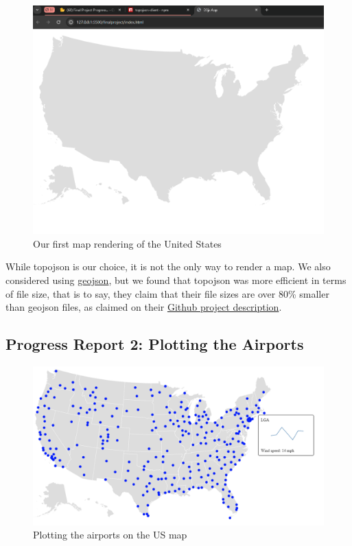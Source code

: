 \documentclass[9pt,twocolumn,twoside]{opticajnl}
\begin{document}
\begin{figure}
    \centering
    \includegraphics[scale=0.25]{images/img1.png}
    \caption{Our first map rendering of the United States}
\end{figure}

While topojson is our choice, it is not the only way to render a map. We also considered using \href{https://geojson.org/}{geojson}, but we found that topojson was more efficient in terms of file size, that is to say, they claim that their file sizes are over 80\% smaller than geojson files, as claimed on their \href{https://github.com/topojson/topojson}{Github project description}.

\subsection{Progress Report 2: Plotting the Airports}

\begin{figure}
    \centering
    \includegraphics[scale=0.25]{images/img2.png}
    \caption{Plotting the airports on the US map}
\end{figure}
\end{document}
